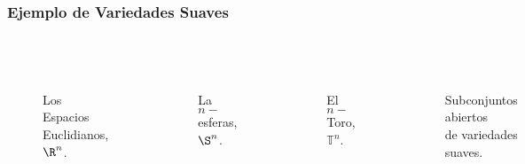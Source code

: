 \begin{frame}
\frametitle{Ejemplo de Variedades Suaves}
\begin{columns}[t]
\centering
  \begin{figure}
    \scalebox{.5}{}\\
    \caption{Los Espacios Euclidianos, $\R^n$.}
  \end{figure}
  \begin{figure}
    \scalebox{.5}{}\\
  \caption{La $n-$esferas, $\S^n$.}
  \end{figure}
\centering
  \begin{figure}
    \scalebox{.5}{}\\
    \caption{El $n-$Toro, $\mathbb{T}^n$.}
  \end{figure}
  \begin{figure}
    \centering
    \scalebox{.5}{}\\
    \caption{Subconjuntos abiertos\\ de variedades suaves.}
  \end{figure}
\end{columns}
\end{frame}
